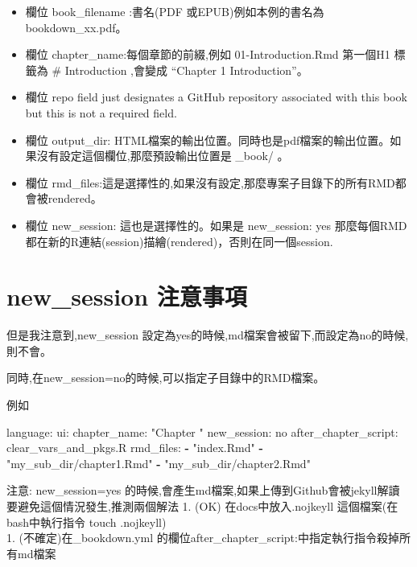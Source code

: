 \documentclass[]{book}
\newenvironment{Shaded}{\begin{snugshade}}{\end{snugshade}}
\newcommand{\AttributeTok}[1]{\textcolor[rgb]{0.77,0.63,0.00}{#1}}
\newcommand{\FunctionTok}[1]{\textcolor[rgb]{0.00,0.00,0.00}{#1}}
\newcommand{\KeywordTok}[1]{\textcolor[rgb]{0.13,0.29,0.53}{\textbf{#1}}}
\newcommand{\StringTok}[1]{\textcolor[rgb]{0.31,0.60,0.02}{#1}}
\providecommand{\tightlist}{%
  \setlength{\itemsep}{0pt}\setlength{\parskip}{0pt}}
\theoremstyle{definition}
\theoremstyle{definition}
\theoremstyle{definition}
\theoremstyle{remark}
\begin{document}
\begin{itemize}
\tightlist
\item
  欄位 book\_filename :書名(PDF
  或EPUB)例如本例的書名為bookdown\_xx.pdf。\\
\item
  欄位 chapter\_name:每個章節的前綴,例如 01-Introduction.Rmd 第一個H1
  標籤為 \# Introduction ,會變成 ``Chapter 1 Introduction''。\\
\item
  欄位 repo field just designates a GitHub repository associated with
  this book but this is not a required field.\\
\item
  欄位 output\_dir:
  HTML檔案的輸出位置。同時也是pdf檔案的輸出位置。如果沒有設定這個欄位,那麼預設輸出位置是
  \_book/ 。\\
\item
  欄位
  rmd\_files:這是選擇性的,如果沒有設定,那麼專案子目錄下的所有RMD都會被rendered。\\
\item
  欄位 new\_session: 這也是選擇性的。如果是 new\_session: yes
  那麼每個RMD都在新的R連結(session)描繪(rendered)，否則在同一個session.
\end{itemize}

\hypertarget{new_session-}{%
\section{new\_session 注意事項}\label{new_session-}}

但是我注意到,new\_session
設定為yes的時候,md檔案會被留下,而設定為no的時候,則不會。

同時,在new\_session=no的時候,可以指定子目錄中的RMD檔案。

例如

\begin{Shaded}
\begin{Highlighting}[]
\FunctionTok{language:}
  \FunctionTok{ui:}
    \FunctionTok{chapter_name:}\AttributeTok{ }\StringTok{"Chapter "}
\FunctionTok{new_session:}\AttributeTok{ no}
\FunctionTok{after_chapter_script:}\AttributeTok{ clear_vars_and_pkgs.R}
\FunctionTok{rmd_files:}
  \KeywordTok{-} \StringTok{"index.Rmd"}
  \KeywordTok{-} \StringTok{"my_sub_dir/chapter1.Rmd"}
  \KeywordTok{-} \StringTok{"my_sub_dir/chapter2.Rmd"}
\end{Highlighting}
\end{Shaded}

注意: new\_session=yes
的時候,會產生md檔案,如果上傳到Github會被jekyll解讀
要避免這個情況發生,推測兩個解法 1. (OK) 在docs中放入.nojkeyll
這個檔案(在bash中執行指令 touch .nojkeyll)\\
1. (不確定)在\_bookdown.yml
的欄位after\_chapter\_script:中指定執行指令殺掉所有md檔案
\end{document}
